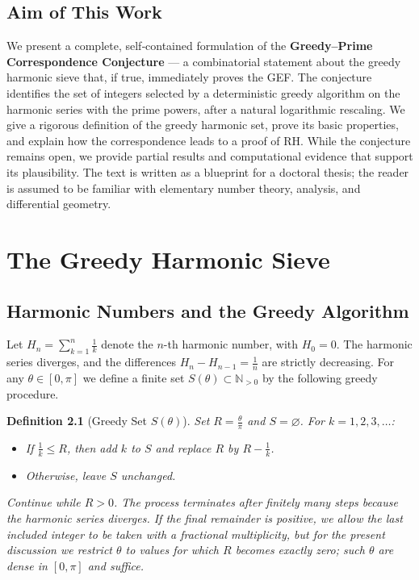 \documentclass[12pt,a4paper,twoside,openright]{book}
\newtheorem{definition}[theorem]{Definition}
\newcommand{\N}{\mathbb{N}}
\begin{document}
\section{Aim of This Work}
We present a complete, self‑contained formulation of the \textbf{Greedy--Prime Correspondence Conjecture} — a combinatorial statement about the greedy harmonic sieve that, if true, immediately proves the GEF.  The conjecture identifies the set of integers selected by a deterministic greedy algorithm on the harmonic series with the prime powers, after a natural logarithmic rescaling.  We give a rigorous definition of the greedy harmonic set, prove its basic properties, and explain how the correspondence leads to a proof of RH.  While the conjecture remains open, we provide partial results and computational evidence that support its plausibility.  The text is written as a blueprint for a doctoral thesis; the reader is assumed to be familiar with elementary number theory, analysis, and differential geometry.

\chapter{The Greedy Harmonic Sieve}
\section{Harmonic Numbers and the Greedy Algorithm}
Let \(H_n = \sum_{k=1}^{n} \frac{1}{k}\) denote the \(n\)-th harmonic number, with \(H_0 = 0\).  The harmonic series diverges, and the differences \(H_n - H_{n-1} = \frac{1}{n}\) are strictly decreasing.  For any \(\theta \in [0,\pi]\) we define a finite set \(S(\theta) \subset \N_{>0}\) by the following greedy procedure.

\begin{definition}[Greedy Set \(S(\theta)\)]
Set \(R = \frac{\theta}{\pi}\) and \(S = \varnothing\).  For \(k = 1,2,3,\dots\):
\begin{itemize}
\item If \(\frac{1}{k} \le R\), then add \(k\) to \(S\) and replace \(R\) by \(R - \frac{1}{k}\).
\item Otherwise, leave \(S\) unchanged.
\end{itemize}
Continue while \(R>0\).  The process terminates after finitely many steps because the harmonic series diverges.  If the final remainder is positive, we allow the last included integer to be taken with a fractional multiplicity, but for the present discussion we restrict \(\theta\) to values for which \(R\) becomes exactly zero; such \(\theta\) are dense in \([0,\pi]\) and suffice.
\end{definition}
\end{document}
